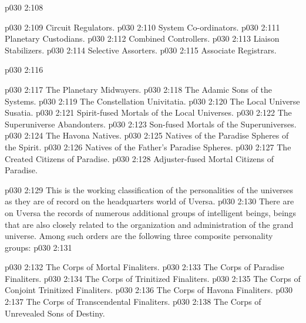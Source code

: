 \pc \vs p030 2:108 \bibnobreakspace {}
\begin{ubquote}
\pc \vs p030 2:109 \bibnobreakspace Circuit Regulators.
\vs p030 2:110 \bibnobreakspace System Co\hyp{}ordinators.
\vs p030 2:111 \bibnobreakspace Planetary Custodians.
\vs p030 2:112 \bibnobreakspace Combined Controllers.
\vs p030 2:113 \bibnobreakspace Liaison Stabilizers.
\vs p030 2:114 \bibnobreakspace Selective Assorters.
\vs p030 2:115 \bibnobreakspace Associate Registrars.
\end{ubquote}
\pc \vs p030 2:116 \kern4pt\bibnobreakspace {}
\begin{ubquote}
\pc \vs p030 2:117 \bibnobreakspace The Planetary Midwayers.
\vs p030 2:118 \bibnobreakspace The Adamic Sons of the Systems.
\vs p030 2:119 \bibnobreakspace The Constellation Univitatia.
\vs p030 2:120 \bibnobreakspace The Local Universe Susatia.
\vs p030 2:121 \bibnobreakspace Spirit\hyp{}fused Mortals of the Local Universes.
\vs p030 2:122 \bibnobreakspace The Superuniverse Abandonters.
\vs p030 2:123 \bibnobreakspace Son\hyp{}fused Mortals of the Superuniverses.
\vs p030 2:124 \bibnobreakspace The Havona Natives.
\vs p030 2:125 \bibnobreakspace Natives of the Paradise Spheres of the Spirit.
\vs p030 2:126 \bibnobreakspace Natives of the Father’s Paradise Spheres.
\vs p030 2:127 \bibnobreakspace The Created Citizens of Paradise.
\vs p030 2:128 \bibnobreakspace Adjuster\hyp{}fused Mortal Citizens of Paradise.
\end{ubquote}
\pc \vs p030 2:129 This is the working classification of the personalities of the universes as they are of record on the headquarters world of Uversa.
\pc \vs p030 2:130  There are on Uversa the records of numerous additional groups of intelligent beings, beings that are also closely related to the organization and administration of the grand universe. Among such orders are the following three composite personality groups:
\pc \vs p030 2:131 \bibnobreakspace {}
\begin{ubquote}
\pc \vs p030 2:132 \bibnobreakspace The Corps of Mortal Finaliters.
\vs p030 2:133 \bibnobreakspace The Corps of Paradise Finaliters.
\vs p030 2:134 \bibnobreakspace The Corps of Trinitized Finaliters.
\vs p030 2:135 \bibnobreakspace The Corps of Conjoint Trinitized Finaliters.
\vs p030 2:136 \bibnobreakspace The Corps of Havona Finaliters.
\vs p030 2:137 \bibnobreakspace The Corps of Transcendental Finaliters.
\vs p030 2:138 \bibnobreakspace The Corps of Unrevealed Sons of Destiny.
\end{ubquote}
